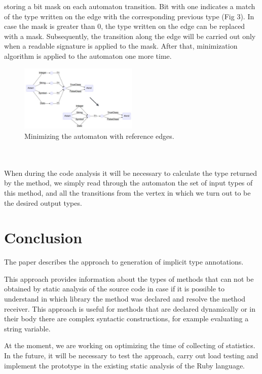 \documentclass[conference]{IEEEtran}
\begin{document}
storing a bit mask on each automaton transition. Bit with one indicates a match of the type written on the edge with
the corresponding previous type (Fig 3). In case the mask is greater than 0, the type written on the edge can be
replaced with a mask. Subsequently, the transition along the edge will be carried out only when a readable signature is
applied to the mask. After that, minimization algorithm is applied to the automaton one more time.
\begin{figure}[h]
    \centering
    \includegraphics[width=0.5\textwidth]{img5}
    \caption{Minimizing the automaton with reference edges.}
\end{figure}
\\
\\
When during the code analysis it will be necessary to calculate the type returned by the method, we simply read through
the automaton the set of input types of this method, and all the transitions from the vertex in which we turn out to be
the desired output types.
\section{Conclusion}
The paper describes the approach to generation of implicit type annotations.
\par This approach provides information about the types of methods that can not be obtained by static analysis of the source code in case if it is possible to understand in which library the method was declared and resolve the method receiver. This approach is useful for methods that are declared dynamically or in their body there are complex syntactic constructions, for example evaluating a string variable.
\par At the moment, we are working on optimizing
the time of collecting of statistics. In the future, it will be necessary to test the approach, carry out load testing
and implement the prototype in the existing static analysis of the Ruby language.



\end{document}
